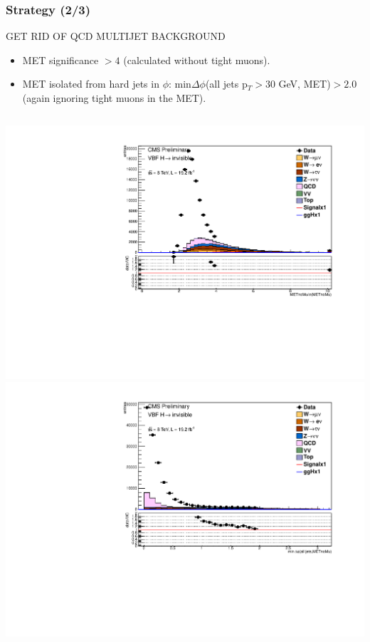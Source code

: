 \documentclass[red,compress,xcolor=table]{beamer}
\begin{document}
\begin{frame}
\frametitle{Strategy (2/3)}

\begin{block}{\centering GET RID OF QCD MULTIJET BACKGROUND}
\begin{itemize}
\item \scriptsize MET significance $>4$ (calculated without tight muons).
\item \scriptsize MET isolated from hard jets in $\phi$: min$\Delta\phi$(all jets p$_T>30$ GeV, MET)$>2.0$ (again ignoring tight muons in the MET).
\end{itemize}
\end{block}
\begin{columns}
\includegraphics[width=1.0\textwidth]{./nopreselnunu_metnomu_significance.pdf}
\includegraphics[width=1.0\textwidth]{./metsigpreselnunu_alljetsmetnomu_mindphi.pdf}
\end{columns}

\end{frame}
\end{document}
